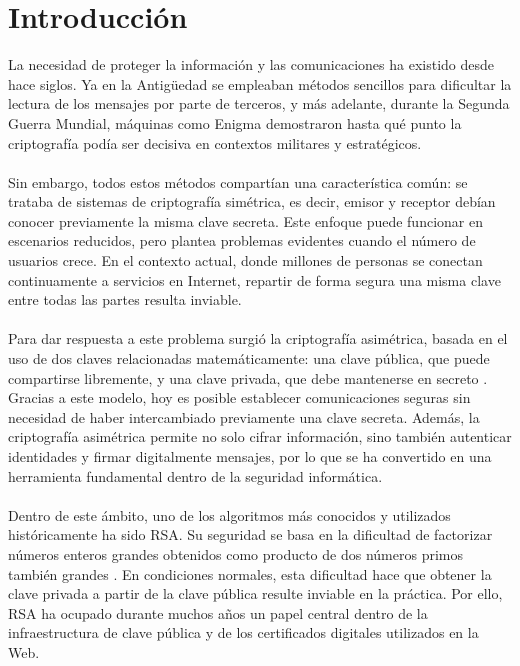 \chapter{Introducción}

La necesidad de proteger la información y las comunicaciones ha existido desde hace siglos. Ya en la Antigüedad se empleaban métodos sencillos para dificultar la lectura de los mensajes por parte de terceros, y más adelante, durante la Segunda Guerra Mundial, máquinas como Enigma demostraron hasta qué punto la criptografía podía ser decisiva en contextos militares y estratégicos.
\\
\\
Sin embargo, todos estos métodos compartían una característica común: se trataba de sistemas de criptografía simétrica, es decir, emisor y receptor debían conocer previamente la misma clave secreta. Este enfoque puede funcionar en escenarios reducidos, pero plantea problemas evidentes cuando el número de usuarios crece. En el contexto actual, donde millones de personas se conectan continuamente a servicios en Internet, repartir de forma segura una misma clave entre todas las partes resulta inviable.
\\
\\
Para dar respuesta a este problema surgió la criptografía asimétrica, basada en el uso de dos claves relacionadas matemáticamente: una clave pública, que puede compartirse libremente, y una clave privada, que debe mantenerse en secreto \cite{rivest1978method}. Gracias a este modelo, hoy es posible establecer comunicaciones seguras sin necesidad de haber intercambiado previamente una clave secreta. Además, la criptografía asimétrica permite no solo cifrar información, sino también autenticar identidades y firmar digitalmente mensajes, por lo que se ha convertido en una herramienta fundamental dentro de la seguridad informática.
\\
\\
Dentro de este ámbito, uno de los algoritmos más conocidos y utilizados históricamente ha sido RSA. Su seguridad se basa en la dificultad de factorizar números enteros grandes obtenidos como producto de dos números primos también grandes \cite{rivest1978method}. En condiciones normales, esta dificultad hace que obtener la clave privada a partir de la clave pública resulte inviable en la práctica. Por ello, RSA ha ocupado durante muchos años un papel central dentro de la infraestructura de clave pública y de los certificados digitales utilizados en la Web.
\\
